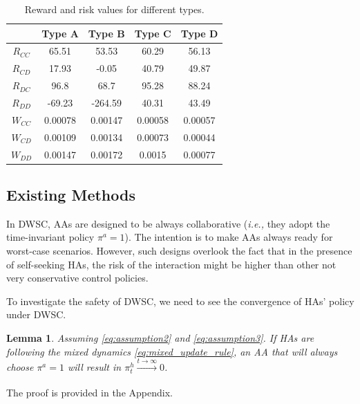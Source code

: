 \documentclass[letterpaper]{article} %
\newcommand{\ie}{\textit{i.e., }}
\newtheorem{lemma}{Lemma}
\begin{document}
\begin{table}[h]
  \begin{center}
    \begin{tabular}{c|c|c|c|c}
      & Type A & Type B & Type C & Type D \\
      \hline
      $R_{CC}$ & 65.51 & 53.53 & 60.29 & 56.13 \\\hline
      $R_{CD}$ & 17.93 & -0.05 & 40.79 & 49.87 \\\hline
      $R_{DC}$ & 96.8 & 68.7 & 95.28 & 88.24\\\hline
      $R_{DD}$ & -69.23 & -264.59 & 40.31 & 43.49 \\\hline
      $W_{CC}$ & 0.00078 & 0.00147 & 0.00058 & 0.00057 \\\hline
      $W_{CD}$ & 0.00109 & 0.00134 & 0.00073 & 0.00044 \\\hline
      $W_{DD}$ & 0.00147 & 0.00172 & 0.0015 & 0.00077
    \end{tabular}
    \caption{Reward and risk values for different types.}
    \label{tab:all_params}
  \end{center}
\end{table}

\subsection{Existing Methods}
In DWSC, AAs are designed to be always collaborative (\ie they adopt the time-invariant policy $\pi^a = 1$). The intention is to make AAs always ready for worst-case scenarios. However, such designs overlook the fact that in the presence of self-seeking HAs, the risk of the interaction might be higher than other not very conservative control policies. 

To investigate the safety of DWSC, we need to see the convergence of HAs' policy under DWSC.
\begin{lemma}
\label{lem:dwsc_not_safe}
Assuming \eqref{eq:assumption2} and \eqref{eq:assumption3}. If HAs are following the mixed dynamics \eqref{eq:mixed_update_rule}, an AA that will always choose $\pi^a = 1$  will result in $\pi^h_t \xrightarrow[]{t\rightarrow\infty} 0$.
\end{lemma}
The proof is provided in the Appendix.
\end{document}
